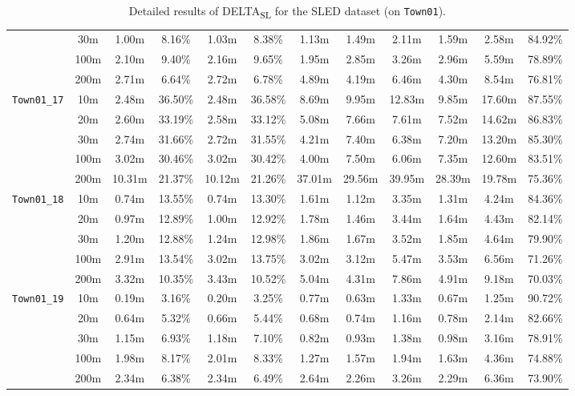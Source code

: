 \begin{table}
{\begin{tabular}{@{}cccccccccccc@{}}
      & 30m & 1.00m & 8.16\% & 1.03m & 8.38\% & 1.13m & 1.49m & 2.11m & 1.59m & 2.58m & 84.92\% \\
      & 100m & 2.10m & 9.40\% & 2.16m & 9.65\% & 1.95m & 2.85m & 3.26m & 2.96m & 5.59m & 78.89\% \\
      & 200m & 2.71m & 6.64\% & 2.72m & 6.78\% & 4.89m & 4.19m & 6.46m & 4.30m & 8.54m & 76.81\% \\
      \midrule
      \multirow{5}{*}{\Verb|Town01_17|} & 10m & 2.48m & 36.50\% & 2.48m & 36.58\% & 8.69m & 9.95m & 12.83m & 9.85m & 17.60m & 87.55\% \\
      & 20m & 2.60m & 33.19\% & 2.58m & 33.12\% & 5.08m & 7.66m & 7.61m & 7.52m & 14.62m & 86.83\% \\
      & 30m & 2.74m & 31.66\% & 2.72m & 31.55\% & 4.21m & 7.40m & 6.38m & 7.20m & 13.20m & 85.30\% \\
      & 100m & 3.02m & 30.46\% & 3.02m & 30.42\% & 4.00m & 7.50m & 6.06m & 7.35m & 12.60m & 83.51\% \\
      & 200m & 10.31m & 21.37\% & 10.12m & 21.26\% & 37.01m & 29.56m & 39.95m & 28.39m & 19.78m & 75.36\% \\
      \midrule
      \multirow{5}{*}{\Verb|Town01_18|} & 10m & 0.74m & 13.55\% & 0.74m & 13.30\% & 1.61m & 1.12m & 3.35m & 1.31m & 4.24m & 84.36\% \\
      & 20m & 0.97m & 12.89\% & 1.00m & 12.92\% & 1.78m & 1.46m & 3.44m & 1.64m & 4.43m & 82.14\% \\
      & 30m & 1.20m & 12.88\% & 1.24m & 12.98\% & 1.86m & 1.67m & 3.52m & 1.85m & 4.64m & 79.90\% \\
      & 100m & 2.91m & 13.54\% & 3.02m & 13.75\% & 3.02m & 3.12m & 5.47m & 3.53m & 6.56m & 71.26\% \\
      & 200m & 3.32m & 10.35\% & 3.43m & 10.52\% & 5.04m & 4.31m & 7.86m & 4.91m & 9.18m & 70.03\% \\
      \midrule
      \multirow{5}{*}{\Verb|Town01_19|} & 10m & 0.19m & 3.16\% & 0.20m & 3.25\% & 0.77m & 0.63m & 1.33m & 0.67m & 1.25m & 90.72\% \\
      & 20m & 0.64m & 5.32\% & 0.66m & 5.44\% & 0.68m & 0.74m & 1.16m & 0.78m & 2.14m & 82.66\% \\
      & 30m & 1.15m & 6.93\% & 1.18m & 7.10\% & 0.82m & 0.93m & 1.38m & 0.98m & 3.16m & 78.91\% \\
      & 100m & 1.98m & 8.17\% & 2.01m & 8.33\% & 1.27m & 1.57m & 1.94m & 1.63m & 4.36m & 74.88\% \\
      & 200m & 2.34m & 6.38\% & 2.34m & 6.49\% & 2.64m & 2.26m & 3.26m & 2.29m & 6.36m & 73.90\% \\
      \bottomrule
    \end{tabular}
  }
  \cprotect\caption{Detailed results of DELTA\textsubscript{SL} for the SLED dataset (on \verb|Town01|).}\label{tab:appendix:delta:full_res_sled_town01}
\end{table}

